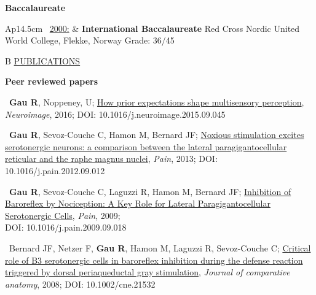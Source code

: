 \documentclass[a4paper,12pt,oneside]{letter}
\begin{document}
{\begin{center}
\large\textbf{Baccalaureate}
\end{center}

\begin{tabular}{Ap{14.5cm}}
\textbullet~\underline{2000:} & \large\textbf{International Baccalaureate} \newline
				\normalsize Red Cross Nordic United World College, Flekke, Norway \newline
				Grade: 36/45 \\
\end{tabular}


\medskip 

\begin{tabular}{B}
\underline{PUBLICATIONS}
\end{tabular}


\begin{center}
\large\textbf{Peer reviewed papers}
\end{center}

\textbullet~\textbf{Gau R}, Noppeney, U; 
\href{http://www.sciencedirect.com/science/article/pii/S1053811915008605}{How prior expectations shape multisensory perception}, \textit{Neuroimage}, 2016; DOI: 10.1016/j.neuroimage.2015.09.045

\textbullet~\textbf{Gau R}, Sevoz-Couche C, Hamon M, Bernard JF; 
\href{http://www.researchgate.net/profile/Remi_Gau/publication/233394350_Noxious_stimulation_excites_serotonergic_neurons_A_comparison_between_the_lateral_paragigantocellular_reticular_and_the_raphe_magnus_nuclei/links/586bf62508aebf17d3a5b232.pdf}{Noxious stimulation excites serotonergic neurons: a comparison between the lateral paragigantocellular reticular and the raphe magnus nuclei}, \textit{Pain}, 2013; DOI: 10.1016/j.pain.2012.09.012

\textbullet~\textbf{Gau R}, Sevoz-Couche C, Laguzzi R, Hamon M, Bernard JF; \href{http://www.researchgate.net/profile/Remi_Gau/publication/38057329_Inhibition_of_cardiac_baroreflex_by_noxious_thermal_stimuli_A_key_role_for_lateral_paragigantocellular_serotonergic_cells/links/586bf90d08ae8fce4919e188.pdf}{Inhibition of Baroreflex by Nociception: A Key Role for Lateral Paragigantocellular Serotonergic Cells}, \textit{Pain}, 2009; \\DOI: 10.1016/j.pain.2009.09.018

\textbullet~Bernard JF, Netzer F, \textbf{Gau R}, Hamon M, Laguzzi R, Sevoz-Couche C; 
\href{http://www.researchgate.net/profile/Remi_Gau/publication/5856955_Critical_role_of_B3_serotonergic_cells_in_baroreflex_inhibition_during_the_defense_reaction_triggered_by_dorsal_periaqueductal_gray_stimulation/links/586bf81d08ae6eb871bb6f47.pdf}{Critical role of B3 serotonergic cells in baroreflex inhibition during the defense reaction triggered by dorsal periaqueductal gray stimulation}, \textit{Journal of comparative anatomy}, 2008; DOI: 10.1002/cne.21532


}
\end{document}
